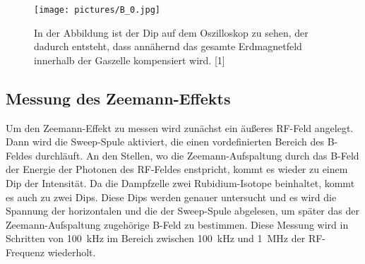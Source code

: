         \FloatBarrier

        \begin{figure}[h]
          \centering
          \texttt{[image: pictures/B\_0.jpg]}
          \caption{In der Abbildung ist der Dip auf dem Oszilloskop zu sehen, der dadurch entsteht, dass annähernd das gesamte Erdmagnetfeld innerhalb der Gaszelle kompensiert wird. [1]}
          \label{fig:B_0_dip}
        \end{figure}

        \FloatBarrier

        \noindent

    \subsection{Messung des Zeemann-Effekts}
        Um den Zeemann-Effekt zu messen wird zunächst ein äußeres RF-Feld angelegt. Dann wird die Sweep-Spule aktiviert, die einen vordefinierten Bereich des B-Feldes durchläuft. An den Stellen, wo die 
        Zeemann-Aufspaltung durch das B-Feld der Energie der Photonen des RF-Feldes enstpricht, kommt es wieder zu einem Dip der Intensität. Da die Dampfzelle zwei Rubidium-Isotope beinhaltet, kommt es auch zu 
        zwei Dips. Diese Dips werden genauer untersucht und es wird die Spannung der horizontalen und die der Sweep-Spule abgelesen, um später das der Zeemann-Aufspaltung zugehörige B-Feld zu bestimmen. Diese 
        Messung wird in Schritten von \SI{100}{\kilo\hertz} im Bereich zwischen \SI{100}{\kilo\hertz} und \SI{1}{\mega\hertz} der RF-Frequenz wiederholt. 

        
        
